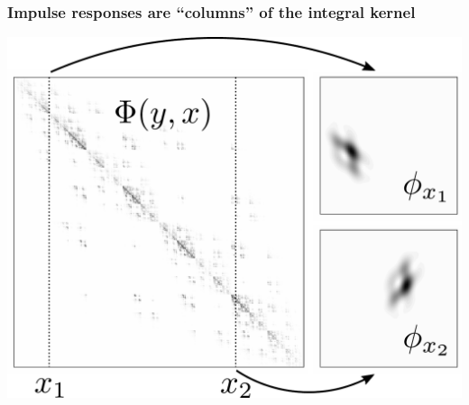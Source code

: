 \documentclass[10pt,final,xcolor=dvipsnames]{beamer}
\begin{document}
\begin{frame}
	\frametitle{Impulse responses are ``columns'' of the integral kernel}
	\begin{center}

	\includegraphics[width=0.7\columnwidth]{kernel_impulse_illustration2.pdf}
		
	\end{center}
\end{frame}
\end{document}

